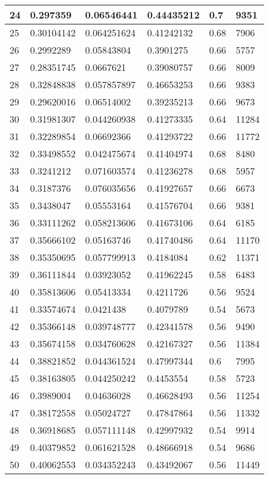 \begin{longtable}{|l|l|l|l|l|l|}
24 & 0.297359 & 0.06546441 & 0.44435212 & 0.7 & 9351 \\ \hline 
25 & 0.30104142 & 0.064251624 & 0.41242132 & 0.68 & 7906 \\ \hline 
26 & 0.2992289 & 0.05843804 & 0.3901275 & 0.66 & 5757 \\ \hline 
27 & 0.28351745 & 0.0667621 & 0.39080757 & 0.66 & 8009 \\ \hline 
28 & 0.32848838 & 0.057857897 & 0.46653253 & 0.66 & 9383 \\ \hline 
29 & 0.29620016 & 0.06514002 & 0.39235213 & 0.66 & 9673 \\ \hline 
30 & 0.31981307 & 0.044260938 & 0.41273335 & 0.64 & 11284 \\ \hline 
31 & 0.32289854 & 0.06692366 & 0.41293722 & 0.66 & 11772 \\ \hline 
32 & 0.33498552 & 0.042475674 & 0.41404974 & 0.68 & 8480 \\ \hline 
33 & 0.3241212 & 0.071603574 & 0.41236278 & 0.68 & 5957 \\ \hline 
34 & 0.3187376 & 0.076035656 & 0.41927657 & 0.66 & 6673 \\ \hline 
35 & 0.3438047 & 0.05553164 & 0.41576704 & 0.66 & 9381 \\ \hline 
36 & 0.33111262 & 0.058213606 & 0.41673106 & 0.64 & 6185 \\ \hline 
37 & 0.35666102 & 0.05163746 & 0.41740486 & 0.64 & 11170 \\ \hline 
38 & 0.35350695 & 0.057799913 & 0.4184084 & 0.62 & 11371 \\ \hline 
39 & 0.36111844 & 0.03923052 & 0.41962245 & 0.58 & 6483 \\ \hline 
40 & 0.35813606 & 0.05413334 & 0.4211726 & 0.56 & 9524 \\ \hline 
41 & 0.33574674 & 0.0421438 & 0.4079789 & 0.54 & 5673 \\ \hline 
42 & 0.35366148 & 0.039748777 & 0.42341578 & 0.56 & 9490 \\ \hline 
43 & 0.35674158 & 0.034760628 & 0.42167327 & 0.56 & 11384 \\ \hline 
44 & 0.38821852 & 0.044361524 & 0.47997344 & 0.6 & 7995 \\ \hline 
45 & 0.38163805 & 0.044250242 & 0.4453554 & 0.58 & 5723 \\ \hline 
46 & 0.3989004 & 0.04636028 & 0.46628493 & 0.56 & 11254 \\ \hline 
47 & 0.38172558 & 0.05024727 & 0.47847864 & 0.56 & 11332 \\ \hline 
48 & 0.36918685 & 0.057111148 & 0.42997932 & 0.54 & 9914 \\ \hline 
49 & 0.40379852 & 0.061621528 & 0.48666918 & 0.54 & 9686 \\ \hline 
50 & 0.40062553 & 0.034352243 & 0.43492067 & 0.56 & 11449 \\ \hline 
\end{longtable}